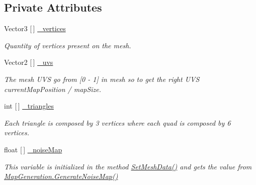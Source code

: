 \subsection*{Private Attributes}
\begin{DoxyCompactItemize}
\item 
\mbox{\label{class_assets_1_1_scripts_1_1_mesh_generation_af896f8b73b6976a3624d780592fe1ac2}} 
Vector3 \mbox{[}$\,$\mbox{]} \mbox{\hyperlink{class_assets_1_1_scripts_1_1_mesh_generation_af896f8b73b6976a3624d780592fe1ac2}{\+\_\+vertices}}
\begin{DoxyCompactList}\small\item\em Quantity of vertices present on the mesh. \end{DoxyCompactList}\item 
\mbox{\label{class_assets_1_1_scripts_1_1_mesh_generation_a1826b6ee3760ef6d95b6f6527116393a}} 
Vector2 \mbox{[}$\,$\mbox{]} \mbox{\hyperlink{class_assets_1_1_scripts_1_1_mesh_generation_a1826b6ee3760ef6d95b6f6527116393a}{\+\_\+uvs}}
\begin{DoxyCompactList}\small\item\em The mesh U\+VS go from \mbox{[}0 -\/ 1\mbox{]} in mesh so to get the right U\+VS current\+Map\+Position / map\+Size. \end{DoxyCompactList}\item 
\mbox{\label{class_assets_1_1_scripts_1_1_mesh_generation_a26988763ce55032ec26336b235de7c9f}} 
int \mbox{[}$\,$\mbox{]} \mbox{\hyperlink{class_assets_1_1_scripts_1_1_mesh_generation_a26988763ce55032ec26336b235de7c9f}{\+\_\+triangles}}
\begin{DoxyCompactList}\small\item\em Each triangle is composed by 3 vertices where each quad is composed by 6 vertices. \end{DoxyCompactList}\item 
\mbox{\label{class_assets_1_1_scripts_1_1_mesh_generation_a7af06a25c928d4a494940cd47bf69aef}} 
float \mbox{[}$\,$\mbox{]} \mbox{\hyperlink{class_assets_1_1_scripts_1_1_mesh_generation_a7af06a25c928d4a494940cd47bf69aef}{\+\_\+noise\+Map}}
\begin{DoxyCompactList}\small\item\em This variable is initialized in the method \mbox{\hyperlink{class_assets_1_1_scripts_1_1_mesh_generation_a132027f38358668e6f8c320b00ee9327}{Set\+Mesh\+Data()}} and gets the value from \mbox{\hyperlink{class_assets_1_1_scripts_1_1_map_generation_a1b9a4afede5e30c156b0a9d848c9182a}{Map\+Generation.\+Generate\+Noise\+Map()}} \end{DoxyCompactList}\item 

\end{DoxyCompactItemize}
